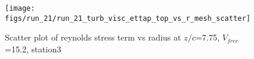 \begin{figure}[H]
\centering
\texttt{[image: figs/run\_21/run\_21\_turb\_visc\_ettap\_top\_vs\_r\_mesh\_scatter]}
\caption{Scatter plot of reynolds stress term vs radius at $z/c$=7.75, $V_{free}$=15.2, station3}
\label{fig:run_21_turb_visc_ettap_top_vs_r_mesh_scatter}
\end{figure}


